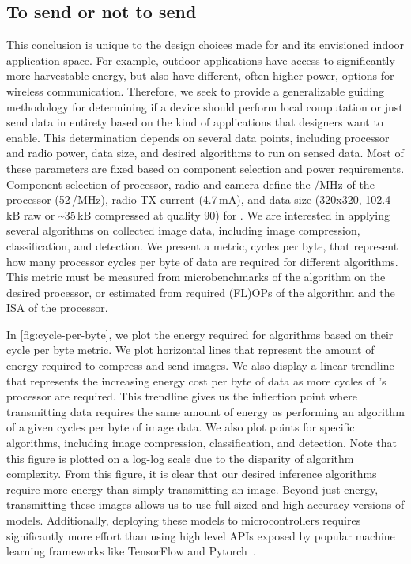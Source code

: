 \subsection{To send or not to send}
This conclusion is unique to the design choices made for \name{} and its envisioned indoor application space. For example, outdoor applications have access to significantly more harvestable energy, but also have different, often higher power, options for wireless communication. Therefore, we seek to provide a generalizable guiding methodology for determining if a device should perform local computation or just send data in entirety based on the kind of applications that designers want to enable. This determination depends on several data points, including processor and radio power, data size, and desired algorithms to run on sensed data.
Most of these parameters are fixed based on component selection and power requirements. Component selection of processor, radio and camera define the \uA/MHz of the processor (52\,\uA/MHz), radio TX current (4.7\,mA), and data size (320x320, 102.4\,kB raw or \textasciitilde35\,kB compressed at quality 90) for \name. We are interested in applying several algorithms on collected image data, including image compression, classification, and detection. We present a metric, cycles per byte, that represent how many processor cycles per byte of data are required for different algorithms. This metric must be measured from microbenchmarks of the algorithm on the desired processor, or estimated from required (FL)OPs of the algorithm and the ISA of the processor.

In \cref{fig:cycle-per-byte}, we plot the energy required for algorithms based on their cycle per byte metric. We plot horizontal lines that represent the amount of energy required to compress and send images. We also display a linear trendline that represents the increasing energy cost per byte of data as more cycles of \name's processor are required. This trendline gives us the inflection point where transmitting data requires the same amount of energy as performing an algorithm of a given cycles per byte of image data. We also plot points for specific algorithms, including image compression, classification, and detection. Note that this figure is plotted on a log-log scale due to the disparity of algorithm complexity.
From this figure, it is clear that our desired inference algorithms require more energy than simply transmitting an image. Beyond just energy, transmitting these images allows us to use full sized and high accuracy versions of models. Additionally, deploying these models to microcontrollers requires significantly more effort than using high level APIs exposed by popular machine learning frameworks like TensorFlow and Pytorch~\cite{8675201}.

